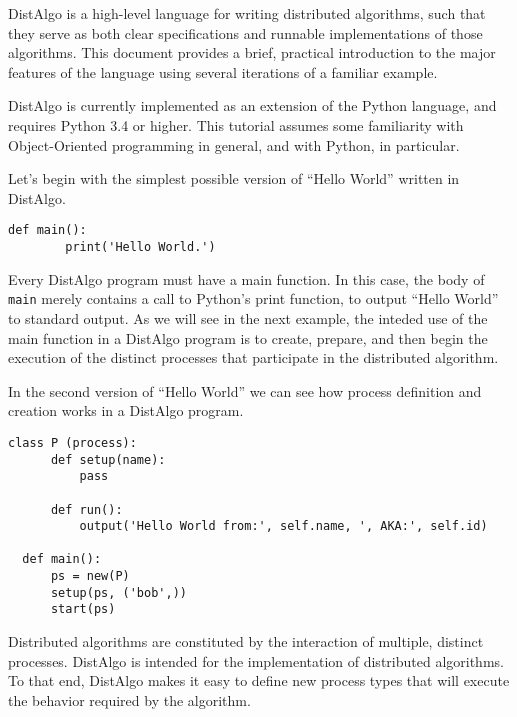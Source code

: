 \documentclass[11pt]{article}
\begin{document}
DistAlgo is a high-level language for writing distributed algorithms, such that
they serve as both clear specifications and runnable implementations of those
algorithms. This document provides a brief, practical introduction to the major
features of the language using several iterations of a familiar example.

DistAlgo is currently implemented as an extension of the Python language, and
requires Python 3.4 or higher. This tutorial assumes some familiarity with
Object-Oriented programming in general, and with Python, in particular.

Let's begin with the simplest possible version of ``Hello World'' written in
DistAlgo.


\begin{lstlisting}[caption={hello\_world01.da - Main Function Definition}, label={lst:hw01}]
    def main():
        print('Hello World.')
\end{lstlisting}

\noindent Every DistAlgo program must have a main function. In this case, the body of
\texttt{main} merely contains a call to Python's print function, to output
``Hello World'' to standard output. As we will see in the next example, the
inteded use of the main function in a DistAlgo program is to create, prepare,
and then begin the execution of the distinct processes that participate in the
distributed algorithm.

In the second version of ``Hello World'' we can see how process definition and
creation works in a DistAlgo program.

\begin{lstlisting}[caption={hello\_world02.da - Process Definition}, label={lst:hw02}]
  class P (process):
      def setup(name):
          pass

      def run():
          output('Hello World from:', self.name, ', AKA:', self.id)

  def main():
      ps = new(P)
      setup(ps, ('bob',))
      start(ps)
\end{lstlisting}

\noindent Distributed algorithms are constituted by the interaction of multiple, distinct
processes. DistAlgo is intended for the implementation of distributed
algorithms. To that end, DistAlgo makes it easy to define new process types
that will execute the behavior required by the algorithm.
\end{document}
